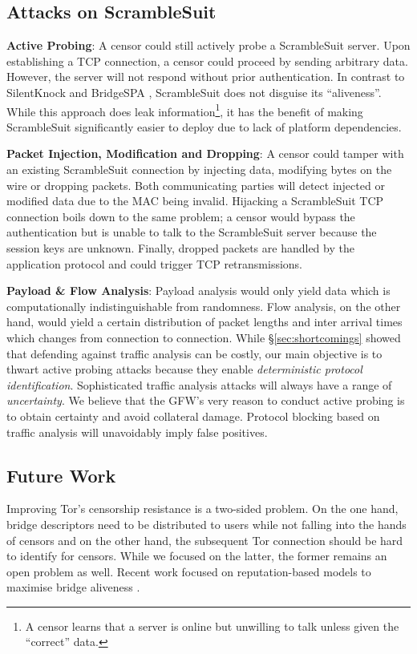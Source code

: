 \documentclass{sig-alternate}
\newcommand{\pt}{\textsf{ScrambleSuit}}
\numberwithin{enumi}{section}
\numberwithin{notesctr}{section}
\begin{document}
{\subsection{Attacks on ScrambleSuit}

\textbf{Active Probing}: A censor could still actively probe a \pt{} server. Upon
establishing a TCP connection, a censor could proceed by sending arbitrary data. However, the server
will not respond without prior authentication. In contrast to SilentKnock \cite{Vasserman2007} and
BridgeSPA \cite{Smits2011}, \pt{} does not disguise its ``aliveness''. While this approach does
leak information\footnote{A censor learns that a server is online but unwilling to talk unless given
the ``correct'' data.}, it has the benefit of making \pt{} significantly easier to deploy due to
lack of platform dependencies.

\textbf{Packet Injection, Modification and Dropping}: A censor could tamper with an existing \pt{}
connection by injecting data, modifying bytes on the wire or dropping packets. Both communicating
parties will detect injected or modified data due to the MAC being invalid. Hijacking a \pt{} TCP
connection boils down to the same problem; a censor would bypass the authentication but is unable to
talk to the \pt{} server because the session keys are unknown. Finally, dropped packets are handled
by the application protocol and could trigger TCP retransmissions.

\textbf{Payload \& Flow Analysis}: Payload analysis would only yield data which is computationally
indistinguishable from randomness. Flow analysis, on the other hand, would yield a certain
distribution of packet lengths and inter arrival times which changes from connection to connection.
While \S \ref{sec:shortcomings} showed that defending against traffic analysis can be costly, our
main objective is to thwart active probing attacks because they enable \emph{deterministic protocol
identification}. Sophisticated traffic analysis attacks will always have a range of
\emph{uncertainty}. We believe that the GFW's very reason to conduct active probing is to obtain
certainty and avoid collateral damage. Protocol blocking based on traffic analysis will unavoidably
imply false positives.

\subsection{Future Work}
Improving Tor's censorship resistance is a two-sided problem. On the one hand, bridge descriptors
need to be distributed to users while not falling into the hands of censors and on the other hand,
the subsequent Tor connection should be hard to identify for censors. While we focused on the
latter, the former remains an open problem as well. Recent work focused on reputation-based models to
maximise bridge aliveness \cite{McCoy2011,Wang2013}.

}
\end{document}
